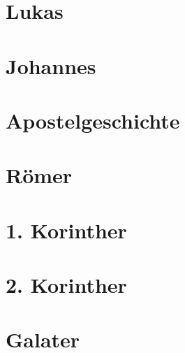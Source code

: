 \chapter{Lukas}
\begin{multicols}{2}
  \raggedcolumns
  \parskip=0pt \relax
  
\end{multicols}

\chapter{Johannes}
\begin{multicols}{2}
  \raggedcolumns
  \parskip=0pt \relax
  
\end{multicols}

\chapter{Apostelgeschichte}
\begin{multicols}{2}
  \raggedcolumns
  \parskip=0pt \relax
  
\end{multicols}

\chapter{Römer}
\begin{multicols}{2}
  \raggedcolumns
  \parskip=0pt \relax
  
\end{multicols}

\chapter{1. Korinther}
\begin{multicols}{2}
  \raggedcolumns
  \parskip=0pt \relax
  
\end{multicols}

\chapter{2. Korinther}
\begin{multicols}{2}
  \raggedcolumns
  \parskip=0pt \relax
  
\end{multicols}

\chapter{Galater}
\begin{multicols}{2}
  \raggedcolumns
  \parskip=0pt \relax
  
\end{multicols}

